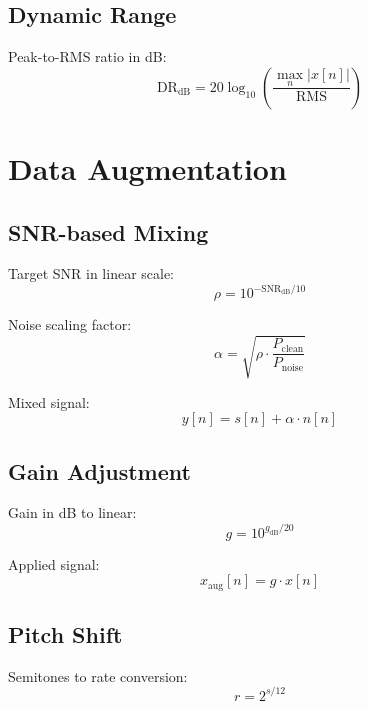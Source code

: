 \documentclass[12pt,a4paper]{article}
\begin{document}
\subsection{Dynamic Range}

Peak-to-RMS ratio in dB:
\begin{equation}
\text{DR}_{\text{dB}} = 20 \log_{10}\left(\frac{\max_n |x[n]|}{\text{RMS}}\right)
\end{equation}

\section{Data Augmentation}

\subsection{SNR-based Mixing}

Target SNR in linear scale:
\begin{equation}
\rho = 10^{-\text{SNR}_{\text{dB}}/10}
\end{equation}

Noise scaling factor:
\begin{equation}
\alpha = \sqrt{\rho \cdot \frac{P_{\text{clean}}}{P_{\text{noise}}}}
\end{equation}

Mixed signal:
\begin{equation}
y[n] = s[n] + \alpha \cdot n[n]
\end{equation}

\subsection{Gain Adjustment}

Gain in dB to linear:
\begin{equation}
g = 10^{g_{\text{dB}}/20}
\end{equation}

Applied signal:
\begin{equation}
x_{\text{aug}}[n] = g \cdot x[n]
\end{equation}

\subsection{Pitch Shift}

Semitones to rate conversion:
\begin{equation}
r = 2^{s/12}
\end{equation}
\end{document}
